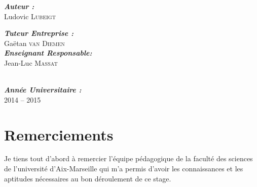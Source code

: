 \documentclass[a4paper,10pt, twoside]{report}
\begin{document}
\begin{spacing}{1.2}
\begin{titlepage}
\begin{center}
    \begin{minipage}{0.4\textwidth}
      \begin{flushleft} \large
        \emph{\bfseries Auteur :}\\
        Ludovic \textsc{Lubeigt}
      \end{flushleft}
    \end{minipage}
    \begin{minipage}{0.4\textwidth}
      \begin{flushright}
        \large \emph{\bfseries Tuteur Entreprise :}\\
        Gaëtan \textsc{van Diemen}\\[0.2cm]
        \emph{\bfseries Enseignant Responsable:}\\
        Jean-Luc \textsc{Massat}
      \end{flushright}
    \end{minipage}\\[1.5cm]
      
    \large\emph{\bfseries Année Universitaire :}\\
    2014 -- 2015

  \end{center}
\end{titlepage}

\begin{abstract}

Ce document présente le travail réalisé lors du stage de fin d'étude
à Arksens Ltd. à l'île Maurice entre le 1 avril 2015 et le 11
septembre 2015 dans le cadre du Master 2 Fiabilité et Sécurité
Informatique à l'Université d'Aix-Marseille.

Le rapport est découpé en deux parties. Une première servant de rapport
de synthèse et présentant l'entreprise, le sujet de stage, le
travail effectué de même que l'environnement de travail et les éventuelles
difficultés rencontrées.
La seconde partie apporte un aspect technique au rapport et permet de 
présenter le travail réalisé plus en détail.
\end{abstract}

\chapter*{Remerciements}
\thispagestyle{fancy}
Je tiens tout d'abord à remercier l'équipe pédagogique de la faculté des
sciences de l'université d'Aix-Marseille qui m'a permis d'avoir les
connaissances et les aptitudes nécessaires au bon déroulement de ce stage.


\end{spacing}
\end{document}
